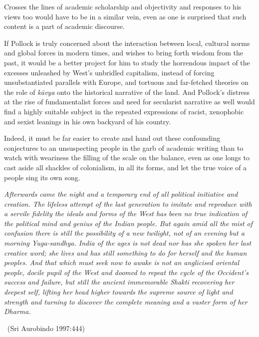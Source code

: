 Crosses the lines of academic scholarship and objectivity and responses to his views too would have to be in a similar vein, even as one is surprised that such content is a part of academic discourse.

If Pollock is truly concerned about the interaction between local, cultural norms and global forces in modern times, and wishes to bring forth wisdom from the past, it would be a better project for him to study the horrendous impact of the excesses unleashed by West’s unbridled capitalism, instead of forcing unsubstantiated parallels with Europe, and tortuous and far-fetched theories on the role of \textit{kāvya} onto the historical narrative of the land. And Pollock’s distress at the rise of fundamentalist forces and need for secularist narrative as well would find a highly suitable subject in the repeated expressions of racist, xenophobic and sexist leanings in his own backyard of his country.

Indeed, it must be far easier to create and hand out these confounding conjectures to an unsuspecting people in the garb of academic writing than to watch with weariness the filling of the scale on the balance, even as one longs to cast aside all shackles of colonialism, in all its forms, and let the true voice of a people sing its own song.
\begin{myquote}
\textit{Afterwards came the night and a temporary end of all political initiative and creation. The lifeless attempt of the last generation to imitate and reproduce with a servile fidelity the ideals and forms of the West has been no true indication of the political mind and genius of the Indian people. But again amid all the mist of confusion there is still the possibility of a new twilight, not of an evening but a morning Yuga-sandhya. India of the ages is not dead nor has she spoken her last creative word; she lives and has still something to do for herself and the human peoples. And that which must seek now to awake is not an anglicised oriental people, docile pupil of the West and doomed to repeat the cycle of the Occident’s success and failure, but still the ancient immemorable Shakti recovering her deepest self, lifting her head higher towards the supreme source of light and strength and turning to discover the complete meaning and a vaster form of her Dharma.} 

~\hfill (Sri Aurobindo 1997:444)
\end{myquote}

